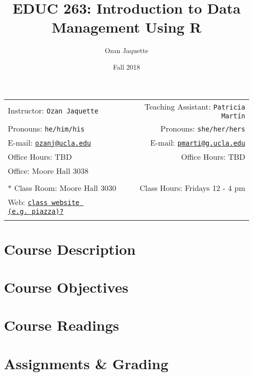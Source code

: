 \documentclass[11pt,]{article}
\title{EDUC 263: Introduction to Data Management Using R}
\author{Ozan Jaquette}
\date{Fall 2018}
\begin{document}
  

		\maketitle
		
	
		\thispagestyle{firststyle}



	\noindent \begin{tabular*}{\textwidth}{ @{\extracolsep{\fill}} lr @{\extracolsep{\fill}}}


Instructor: \texttt{Ozan Jaquette} & Teaching Assistant: \texttt{Patricia Martín} \\
Pronouns: \texttt{he/him/his} & Pronouns: \texttt{she/her/hers} \\
E-mail: \texttt{\href{mailto:ozanj@ucla.edu}{\nolinkurl{ozanj@ucla.edu}}} & E-mail: \texttt{\href{mailto:pmarti@g.ucla.edu}{\nolinkurl{pmarti@g.ucla.edu}}} \\ 
Office Hours: TBD  & Office Hours: TBD \\
Office: Moore Hall 3038 \\
\\ *
Class Room: Moore Hall 3030 & Class Hours: Fridays 12 - 4 pm\\
Web: \href{http://class website (e.g.~piazza)?}{\tt class website (e.g.~piazza)?}\\
	&  \\
	\hline
	\end{tabular*}
	
\vspace{2mm}
	


\section{Course Description}\label{course-description}

\section{Course Objectives}\label{course-objectives}

\section{Course Readings}\label{course-readings}

\pagebreak  

\section{Assignments \& Grading}\label{assignments-grading}
\end{document}
